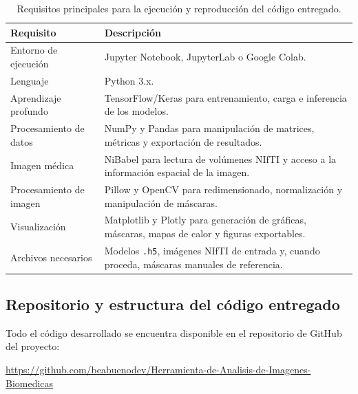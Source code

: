 \begin{table}[H]
\centering
\small
\renewcommand{\arraystretch}{1.2}
\begin{tabularx}{\textwidth}{p{} X}
\hline
\textbf{Requisito} & \textbf{Descripción} \\
\hline

Entorno de ejecución &
Jupyter Notebook, JupyterLab o Google Colab. \\

Lenguaje &
Python 3.x. \\

Aprendizaje profundo &
TensorFlow/Keras para entrenamiento, carga e inferencia de los modelos. \\

Procesamiento de datos &
NumPy y Pandas para manipulación de matrices, métricas y exportación de resultados. \\

Imagen médica &
NiBabel para lectura de volúmenes NIfTI y acceso a la información espacial de la imagen. \\

Procesamiento de imagen &
Pillow y OpenCV para redimensionado, normalización y manipulación de máscaras. \\

Visualización &
Matplotlib y Plotly para generación de gráficas, máscaras, mapas de calor y figuras exportables. \\

Archivos necesarios &
Modelos \texttt{.h5}, imágenes NIfTI de entrada y, cuando proceda, máscaras manuales de referencia. \\

\hline
\end{tabularx}
\caption{Requisitos principales para la ejecución y reproducción del código entregado.}
\label{tab:requisitos_codigo}
\end{table}

\subsection{Repositorio y estructura del código entregado}

Todo el código desarrollado se encuentra disponible en el repositorio de GitHub del proyecto:

\begin{center}
\url{https://github.com/beabuenodev/Herramienta-de-Analisis-de-Imagenes-Biomedicas}
\end{center}